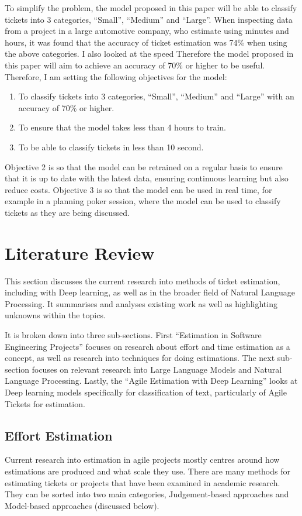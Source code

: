 \documentclass{UoYCSproject}
\begin{document}
    To simplify the problem, the model proposed in this paper will be able to classify tickets into 3 categories, “Small”, “Medium” and “Large”.
    When inspecting data from a project in a large automotive company, who estimate using minutes and hours, it was found that the accuracy of ticket estimation was 74\% when using the above categories. I also looked at the speed
    Therefore the model proposed in this paper will aim to achieve an accuracy of 70\% or higher to be useful.
    Therefore, I am setting the following objectives for the model:
    \begin{enumerate}
        \item To classify tickets into 3 categories, “Small”, “Medium” and “Large” with an accuracy of 70\% or higher.
        \item To ensure that the model takes less than 4 hours to train.
        \item To be able to classify tickets in less than 10 second.
    \end{enumerate}

    Objective 2 is so that the model can be retrained on a regular basis to ensure that it is up to date with the latest data, ensuring continuous learning but also reduce costs.
    Objective 3 is so that the model can be used in real time, for example in a planning poker session, where the model can be used to classify tickets as they are being discussed.


    \chapter{Literature Review}
    \label{ch:literature-review}
    This section discusses the current research into methods of ticket estimation, including with Deep learning, as well as in the broader field of Natural Language Processing.
    It summarises and analyses existing work as well as highlighting unknowns within the topics.

    It is broken down into three sub-sections.
    First “Estimation in Software Engineering Projects” focuses on research about effort and time estimation as a concept, as well as research into techniques for doing estimations.
    The next sub-section focuses on relevant research into Large Language Models and Natural Language Processing.
    Lastly, the “Agile Estimation with Deep Learning” looks at Deep learning models specifically for classification of text, particularly of Agile Tickets for estimation.


    \section{Effort Estimation}
    \label{sec:effort-estimation}
    Current research into estimation in agile projects mostly centres around how estimations are produced and what scale they use.
    There are many methods for estimating tickets or projects that have been examined in academic research.
    They can be sorted into two main categories, Judgement-based approaches and Model-based approaches (discussed below).
\end{document}
